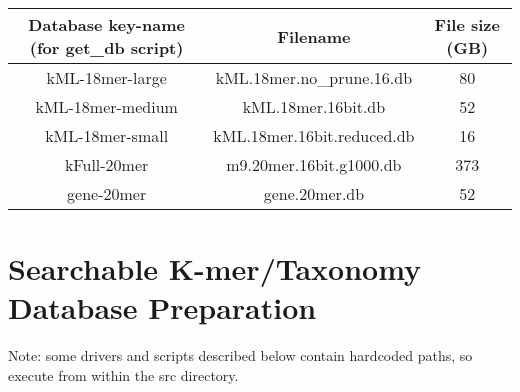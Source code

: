 \documentclass[11pt]{article}
\begin{document}
\begin{tabular}{| c | c | c |}
\hline
Database key-name (for get\_db script) & Filename & File size (GB) \\
\hline
kML-18mer-large & kML.18mer.no_prune.16.db & 80 \\
\hline
kML-18mer-medium & kML.18mer.16bit.db  & 52 \\
\hline
kML-18mer-small & kML.18mer.16bit.reduced.db  & 16 \\
\hline
kFull-20mer & m9.20mer.16bit.g1000.db & 373 \\
\hline
gene-20mer & gene.20mer.db & 52 \\
\hline
\end{tabular}

\section{Searchable K-mer/Taxonomy Database Preparation}


Note: some drivers and scripts described below contain hardcoded paths,
      so execute from within the src directory.
\end{document}
